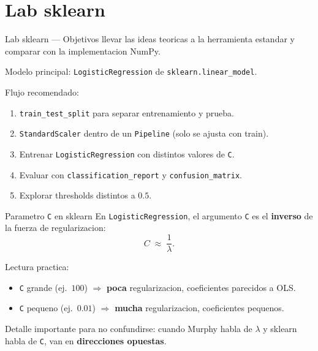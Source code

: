 \section[Lab sklearn]{Lab sklearn\label{sec:lab-sklearn-w11}}

\begin{frame}{Lab sklearn — Objetivos}
 llevar las ideas teoricas a la herramienta estandar y comparar con la implementacion NumPy.

\vspace{0.25em}
Modelo principal: \texttt{LogisticRegression} de \texttt{sklearn.linear\_model}.

\vspace{0.25em}
Flujo recomendado:
\begin{enumerate}\footnotesize
  \item \texttt{train\_test\_split} para separar entrenamiento y prueba.
  \item \texttt{StandardScaler} dentro de un \texttt{Pipeline} (solo se ajusta con train).
  \item Entrenar \texttt{LogisticRegression} con distintos valores de \texttt{C}.
  \item Evaluar con \texttt{classification\_report} y \texttt{confusion\_matrix}.
  \item Explorar thresholds distintos a $0.5$.
\end{enumerate}
\end{frame}

\begin{frame}{Parametro \texttt{C} en sklearn}
En \texttt{LogisticRegression}, el argumento \texttt{C} es el \textbf{inverso} de la fuerza de regularizacion:
\[
C \;\approx\; \frac{1}{\lambda}.
\]

\vspace{0.25em}
Lectura practica:
\begin{itemize}\small
  \item \texttt{C} grande (ej.\ $100$) $\Rightarrow$ \textbf{poca} regularizacion, coeficientes parecidos a OLS.
  \item \texttt{C} pequeno (ej.\ $0.01$) $\Rightarrow$ \textbf{mucha} regularizacion, coeficientes pequenos.
\end{itemize}

\vspace{0.25em}
{\footnotesize Detalle importante para no confundirse: cuando Murphy habla de $\lambda$ y sklearn habla de \texttt{C}, van en \textbf{direcciones opuestas}.}
\end{frame}

